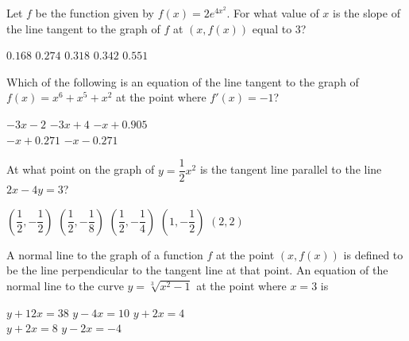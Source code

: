 \begin{questions}
    \question Let $f$ be the function given by $f(x) = 2e^{4x^2}$. For what value of $x$ is the slope of the line tangent to the graph of $f$ at $\left(x, f(x)\right)$ equal to $3$? \\

    \begin{oneparchoices}
        \choice $0.168$ 
        \choice $0.274$
        \choice $0.318$
        \choice $0.342$
        \choice $0.551$
    \end{oneparchoices} \par \horizontalline

    \question Which of the following is an equation of the line tangent to the graph of $f(x) = x^6 + x^5 + x^2$ at the point where $f'(x) = -1$? \\

    \begin{oneparchoices}
        \choice $-3x - 2$
        \choice $-3x + 4$
        \choice $-x + 0.905$ \\[11pt]
        \makebox[0.23 \textwidth] \choice $-x + 0.271$
        \makebox[0.27 \textwidth]\choice $-x - 0.271$
    \end{oneparchoices} \par \horizontalline

    \question At what point on the graph of $y = \dfrac{1}{2}x^2$ is the tangent line parallel to the line $2x - 4y = 3$? \\

    \begin{oneparchoices}
        \choice $\left(\dfrac{1}{2}, -\dfrac{1}{2}\right)$
        \choice $\left(\dfrac{1}{2}, -\dfrac{1}{8}\right)$
        \choice $\left(\dfrac{1}{2}, -\dfrac{1}{4}\right)$
        \choice $\left(1, -\dfrac{1}{2}\right)$
        \choice $(2, 2)$
    \end{oneparchoices} \par \horizontalline

    \question A normal line to the graph of a function $f$ at the point $(x, f(x))$ is defined to be the line perpendicular to the tangent line at that point. An equation of the normal line to the curve $y = \sqrt[3]{x^2 - 1}$ at the point where $x = 3$ is \\

    \begin{oneparchoices}
        \choice $y + 12x = 38$
        \choice $y - 4x = 10$
        \choice $y + 2x = 4$ \\[11pt]
        \makebox[0.25 \textwidth] \choice $y + 2x = 8$
        \makebox[0.27 \textwidth] \choice $y - 2x = -4$
    \end{oneparchoices} \par \horizontalline


\end{questions}
